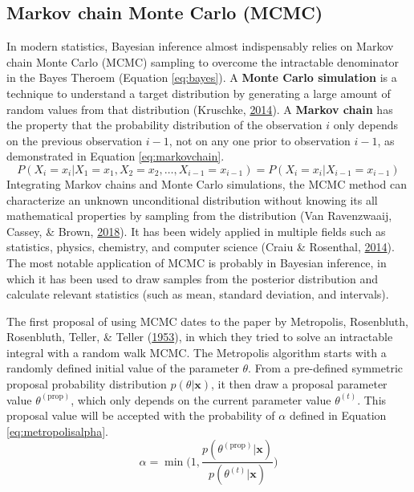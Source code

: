 \documentclass[12pt]{book}
\numberwithin{equation}{chapter}
\begin{document}
\hypertarget{markov-chain-monte-carlo-mcmc}{%
\subsection{Markov chain Monte Carlo (MCMC)}\label{markov-chain-monte-carlo-mcmc}}

In modern statistics, Bayesian inference almost indispensably relies on Markov chain Monte Carlo (MCMC) sampling to overcome the intractable denominator in the Bayes Theroem (Equation \eqref{eq:bayes}). A \textbf{Monte Carlo simulation} is a technique to understand a target distribution by generating a large amount of random values from that distribution (Kruschke, \protect\hyperlink{ref-kruschke2014doing}{2014}). A \textbf{Markov chain} has the property that the probability distribution of the observation \(i\) only depends on the previous observation \(i-1\), not on any one prior to observation \(i-1\), as demonstrated in Equation \eqref{eq:markovchain}.
\begin{equation}
P\left(X_{i}=x_{i} | X_{1}=x_{1}, X_{2}=x_{2}, \ldots, X_{i-1}=x_{i-1}\right) = P\left(X_{i}=x_{i} | X_{i-1}=x_{i-1}\right)
\label{eq:markovchain}
\end{equation}
Integrating Markov chains and Monte Carlo simulations, the MCMC method can characterize an unknown unconditional distribution without knowing its all mathematical properties by sampling from the distribution (Van Ravenzwaaij, Cassey, \& Brown, \protect\hyperlink{ref-van2018simple}{2018}). It has been widely applied in multiple fields such as statistics, physics, chemistry, and computer science (Craiu \& Rosenthal, \protect\hyperlink{ref-craiu2014bayesian}{2014}). The most notable application of MCMC is probably in Bayesian inference, in which it has been used to draw samples from the posterior distribution and calculate relevant statistics (such as mean, standard deviation, and intervals).

The first proposal of using MCMC dates to the paper by Metropolis, Rosenbluth, Rosenbluth, Teller, \& Teller (\protect\hyperlink{ref-metropolis1953equation}{1953}), in which they tried to solve an intractable integral with a random walk MCMC. The Metropolis algorithm starts with a randomly defined initial value of the parameter \(\theta\). From a pre-defined symmetric proposal probability distribution \(p(\theta | \mathbf{x})\), it then draw a proposal parameter value \(\theta^{(\text{prop})}\), which only depends on the current parameter value \(\theta^{(t)}\). This proposal value will be accepted with the probability of \(\alpha\) defined in Equation \eqref{eq:metropolisalpha}.
\begin{equation}
\alpha = \min\bigg(1, \frac{p(\theta^{(\text{prop})}|\mathbf{x})}{p(\theta^{(t)}|\mathbf{x})}\bigg)
\label{eq:metropolisalpha}
\end{equation}
\end{document}

